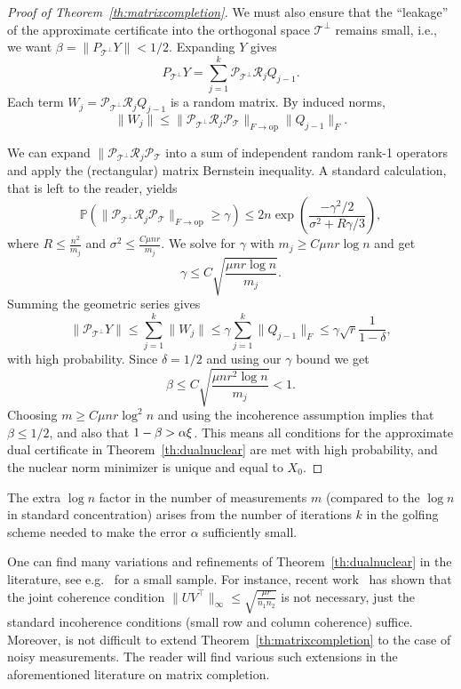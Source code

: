 \begin{proof}[Proof of Theorem~\ref{th:matrixcompletion}]
We must also ensure that the ``leakage'' of the approximate certificate into the orthogonal space $\mathcal{T}^\perp$ remains small, i.e., we want $\beta = \|P_{\mathcal{T}^\perp} Y\| < 1/2$.
Expanding $Y$ gives
$$P_{\mathcal{T}^\perp} Y = \sum_{j=1}^k \mathcal{P}_{\mathcal{T}^\perp} \mathcal{R}_j Q_{j-1}.$$
Each term $W_j = \mathcal{P}_{\mathcal{T}^\perp} \mathcal{R}_j Q_{j-1}$ is a random matrix. 
 By  induced norms,
$$\|W_j\| \le \|\mathcal{P}_{\mathcal{T}^\perp} \mathcal{R}_j \mathcal{P}_{\mathcal{T}}\|_{F \to \text{op}} \|Q_{j-1}\|_F.$$

We can expand $\|\mathcal{P}_{\mathcal{T}^\perp} \mathcal{R}_j \mathcal{P}_{\mathcal{T}}$ into a sum of independent random rank-1 operators and apply the (rectangular) matrix Bernstein inequality. A  standard calculation, that is left to the reader, yields
$$\mathbb{P} \left( \|\mathcal{P}_{\mathcal{T}^\perp} \mathcal{R}_j \mathcal{P}_{\mathcal{T}}\|_{F \to \text{op}} \ge \gamma \right) \le 2n \exp \left( \frac{-\gamma^2 / 2}{\sigma^2 + R\gamma / 3} \right),$$
where $R  \le \frac{n^2}{m_j}$ and $\sigma^2 \le \frac{C \mu n r}{m_j}$.
We solve for $\gamma$ with $m_j \ge C \mu n r \log n$ and get
$$\gamma \le C \sqrt{\frac{\mu n r \log n}{m_j}}.$$
Summing the geometric series gives
$$\|{\mathcal P}_{{\mathcal T}^\perp} Y\| \le \sum_{j=1}^k \|W_j\| \le  \gamma \sum_{j=1}^k \|Q_{j-1}\|_F \le \gamma  \sqrt{r} \frac{1}{1-\delta},$$
with high probability.
Since $\delta = 1/2$ and using our $\gamma$ bound we get
$$\beta \le C\sqrt{\frac{\mu n r^2 \log n}{m_j}} < 1.$$
Choosing  $m \ge C \mu n r \log^2 n$ and using the incoherence assumption implies that $\beta \le 1/2$, and also that
$1-\beta > \alpha \xi$. This means all conditions for the approximate dual certificate in Theorem~\ref{th:dualnuclear} are met with high probability, and the nuclear norm minimizer is unique and equal to $X_0$. 

\end{proof}

The extra $\log n$ factor in the number of measurements $m$ (compared to the $\log n$ in standard concentration) arises from the number of iterations $k$ in the golfing scheme needed to make the error $\alpha$ sufficiently small.


One can find many variations and refinements of Theorem~\ref{th:dualnuclear} in the literature, see e.g.~\cite{candes2010matrix,candes2010power,keshavan2010matrix,candes2011robust,fuchs2022proof,WrightMa,gandy2011tensor,liu2012tensor} for a small sample. For instance, recent work~\cite{chen2015incoherence} has shown that the joint coherence condition 
$\|UV^\top\|_\infty \le \sqrt{\frac{\mu r}{n_1 n_2}}$
is not necessary, just the standard incoherence conditions (small row and column coherence) suffice. Moreover,  is not difficult to extend Theorem~\ref{th:matrixcompletion} to the case of noisy measurements. The reader will find various such extensions in the aforementioned literature on matrix completion.

